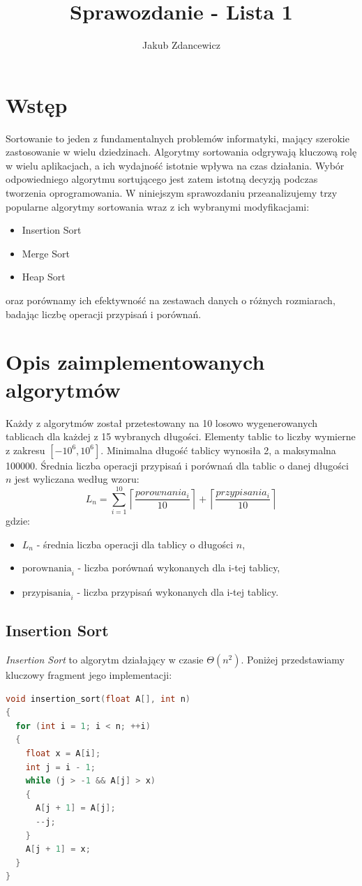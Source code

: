 \documentclass{article}
\title{Sprawozdanie - Lista 1}
\author{Jakub Zdancewicz}
\date{}
\begin{document}
\maketitle

\tableofcontents
\newpage

\section{Wstęp}
Sortowanie to jeden z fundamentalnych problemów informatyki, mający szerokie zastosowanie w wielu dziedzinach. Algorytmy sortowania odgrywają kluczową rolę w wielu aplikacjach, a ich wydajność istotnie wpływa na czas działania. Wybór odpowiedniego algorytmu sortującego jest zatem istotną decyzją podczas tworzenia oprogramowania. W niniejszym sprawozdaniu przeanalizujemy trzy popularne algorytmy sortowania wraz z ich wybranymi modyfikacjami:
\begin{itemize}
    \item Insertion Sort
    \item Merge Sort
    \item Heap Sort
\end{itemize}
oraz porównamy ich efektywność na zestawach danych o różnych rozmiarach, badając liczbę operacji przypisań i porównań.


\section{Opis zaimplementowanych algorytmów}
Każdy z algorytmów został przetestowany na 10 losowo wygenerowanych tablicach dla każdej z 15 wybranych długości. Elementy tablic to liczby wymierne z zakresu $[-10^6, 10^6]$. Minimalna długość tablicy wynosiła 2, a maksymalna 100000. Średnia liczba operacji przypisań i porównań dla tablic o danej długości $n$ jest wyliczana według wzoru:
\[
    L_n = \sum_{i=1}^{10} \left\lceil\frac{porownania_i}{10}\right\rceil + \left\lceil\frac{przypisania_i}{10}\right\rceil
\]
gdzie:
\begin{itemize}
    \item[] $L_n$ - średnia liczba operacji dla tablicy o długości $n$,
    \item[] $\text{porownania}_i$ - liczba porównań wykonanych dla i-tej tablicy,
    \item[] $\text{przypisania}_i$ - liczba przypisań wykonanych dla i-tej tablicy.
\end{itemize}

\newpage
\subsection{Insertion Sort}
\textit{Insertion Sort} to algorytm działający w czasie $\Theta(n^2)$. Poniżej przedstawiamy kluczowy fragment jego implementacji:
\begin{lstlisting}[style=mystyle, language=C++, caption={Implementacja Insertion Sort}, label={lst:insertion}]
void insertion_sort(float A[], int n)
{
  for (int i = 1; i < n; ++i)
  {
    float x = A[i];
    int j = i - 1;
    while (j > -1 && A[j] > x)
    {
      A[j + 1] = A[j];
      --j;
    }
    A[j + 1] = x;
  }
}
\end{lstlisting}
\end{document}
